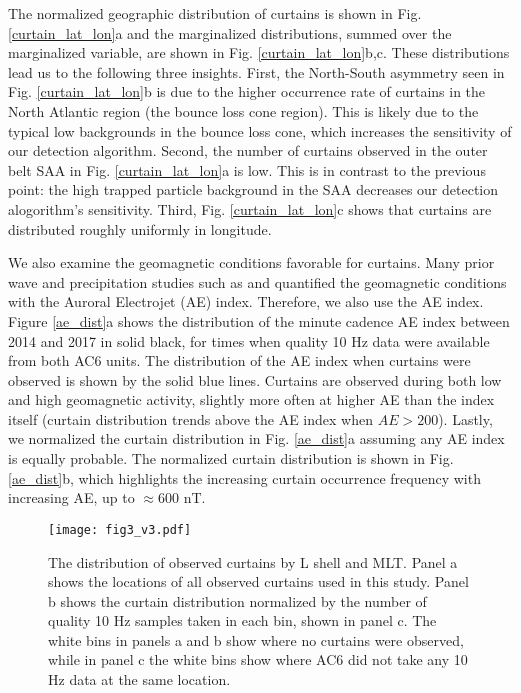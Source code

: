 \documentclass[draft]{agujournal2019}
\begin{document}
The normalized geographic distribution of curtains is shown in Fig. \ref{curtain_lat_lon}a and the marginalized distributions, summed over the marginalized variable, are shown in Fig. \ref{curtain_lat_lon}b,c. These distributions lead us to the following three insights. First, the North-South asymmetry seen in Fig. \ref{curtain_lat_lon}b is due to the higher occurrence rate of curtains in the North Atlantic region (the bounce loss cone region). This is likely due to the typical low backgrounds in the bounce loss cone, which increases the sensitivity of our detection algorithm. Second, the number of curtains observed in the outer belt SAA in Fig. \ref{curtain_lat_lon}a is low. This is in contrast to the previous point: the high trapped particle background in the SAA decreases our detection alogorithm's sensitivity. Third, Fig. \ref{curtain_lat_lon}c shows that curtains are distributed roughly uniformly in longitude.

We also examine the geomagnetic conditions favorable for curtains. Many prior wave and precipitation studies such as  and  quantified the geomagnetic conditions with the Auroral Electrojet (AE) index. Therefore, we also use the AE index. Figure \ref{ae_dist}a shows the distribution of the minute cadence AE index between 2014 and 2017 in solid black, for times when quality 10 Hz data were available from both AC6 units. The distribution of the AE index when curtains were observed is shown by the solid blue lines. Curtains are observed during both low and high geomagnetic activity, slightly more often at higher AE than the index itself (curtain distribution trends above the AE index when $AE > 200$). Lastly, we normalized the curtain distribution in Fig. \ref{ae_dist}a assuming any AE index is equally probable. The normalized curtain distribution is shown in Fig. \ref{ae_dist}b, which highlights the increasing curtain occurrence frequency with increasing AE, up to $\approx 600$ nT.

\begin{figure}
\texttt{[image: fig3\_v3.pdf]}
\caption{The distribution of observed curtains by L shell and MLT. Panel a shows the locations of all observed curtains used in this study. Panel b shows the curtain distribution normalized by the number of quality 10 Hz samples taken in each bin, shown in panel c. The white bins in panels a and b show where no curtains were observed, while in panel c the white bins show where AC6 did not take any 10 Hz data at the same location.}
\label{l_mlt_dist}
\end{figure}
\end{document}
